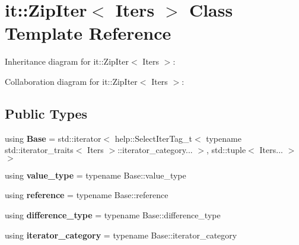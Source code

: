 \hypertarget{classit_1_1ZipIter}{}\section{it\+:\+:Zip\+Iter$<$ Iters $>$ Class Template Reference}
\label{classit_1_1ZipIter}


Inheritance diagram for it\+:\+:Zip\+Iter$<$ Iters $>$\+:


Collaboration diagram for it\+:\+:Zip\+Iter$<$ Iters $>$\+:
\subsection*{Public Types}
\begin{DoxyCompactItemize}
\item 
using {\bfseries Base} = std\+::iterator$<$ help\+::\+Select\+Iter\+Tag\+\_\+t$<$ typename std\+::iterator\+\_\+traits$<$ Iters $>$\+::iterator\+\_\+category... $>$, std\+::tuple$<$ Iters... $>$ $>$\hypertarget{classit_1_1ZipIter_a60ac1f229d76578d58d7a3145cea50a2}{}\label{classit_1_1ZipIter_a60ac1f229d76578d58d7a3145cea50a2}

\item 
using {\bfseries value\+\_\+type} = typename Base\+::value\+\_\+type\hypertarget{classit_1_1ZipIter_ae791d86f6da69eb33acd64279066e510}{}\label{classit_1_1ZipIter_ae791d86f6da69eb33acd64279066e510}

\item 
using {\bfseries reference} = typename Base\+::reference\hypertarget{classit_1_1ZipIter_ab522802d007569186bf0e8183d78afdd}{}\label{classit_1_1ZipIter_ab522802d007569186bf0e8183d78afdd}

\item 
using {\bfseries difference\+\_\+type} = typename Base\+::difference\+\_\+type\hypertarget{classit_1_1ZipIter_aea787d92223168a56c05aa0dda4d1636}{}\label{classit_1_1ZipIter_aea787d92223168a56c05aa0dda4d1636}

\item 
using {\bfseries iterator\+\_\+category} = typename Base\+::iterator\+\_\+category\hypertarget{classit_1_1ZipIter_a0573a9f37bbded1244e2d4393354a3a1}{}\label{classit_1_1ZipIter_a0573a9f37bbded1244e2d4393354a3a1}

\end{DoxyCompactItemize}
